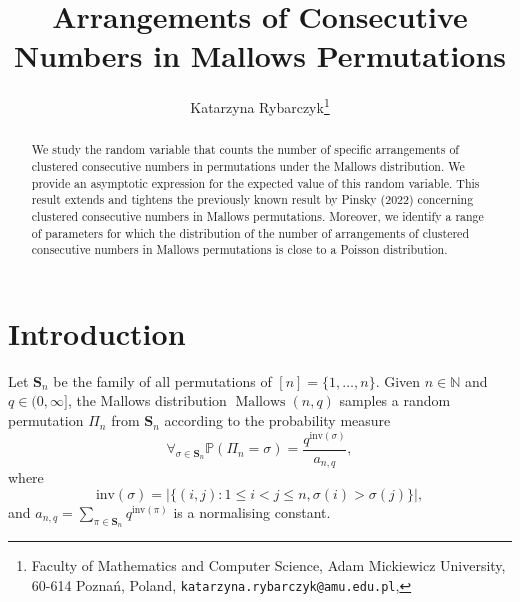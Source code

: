 \documentclass[letterpaper,11pt]{article}
\theoremstyle{definition}
\theoremstyle{remark}
\renewcommand{\le}{\leqslant}
\DeclareMathOperator{\Mallow}{Mallows}
\newcommand{\bN}{\mathbb{N}}
\newcommand{\bS}{\mathbf{S}}
\newcommand{\Pra}[1]{\mathbb{P}\left(#1\right)}
\begin{document}
  
 


\title{Arrangements of Consecutive Numbers in Mallows Permutations}

\author{Katarzyna Rybarczyk\thanks{Faculty of Mathematics and Computer Science, Adam Mickiewicz University, 60-614 Pozna\'n, Poland, \texttt{katarzyna.rybarczyk@amu.edu.pl}, %
} %
}
 

\date{}

\maketitle
\begin{abstract} We study the random variable that counts the number of specific arrangements of clustered consecutive numbers in permutations under the Mallows distribution. We provide an asymptotic expression for the expected value of this random variable. This result extends and tightens the previously known result by Pinsky (2022) concerning clustered consecutive numbers in Mallows permutations. Moreover, we identify a range of parameters for which the distribution of the number of arrangements of clustered consecutive numbers in Mallows permutations is close to a Poisson distribution.
\end{abstract} 	

\section{Introduction}

Let $\bS_n$ be the family of all permutations of $[n]=\{1,\ldots,n\}$. Given $n\in \bN$ and $q\in (0,\infty]$, the Mallows distribution $\Mallow(n,q)$ samples a random permutation $\varPi_n$ from $\bS_n$ according to the probability measure
\[\forall_{\sigma\in \bS_n}\Pra{\varPi_n=\sigma}=\frac{q^{\text{inv}(\sigma)}}{a_{n,q}},\]
where 
\[
\text{inv}(\sigma)=|\{(i,j):1\le i<j \le n, \sigma(i)>\sigma(j)\}|,
\]
and $a_{n,q}=\sum_{\pi\in \bS_n}q^{\text{inv}(\pi)}$ is a normalising constant. 
\end{document}
